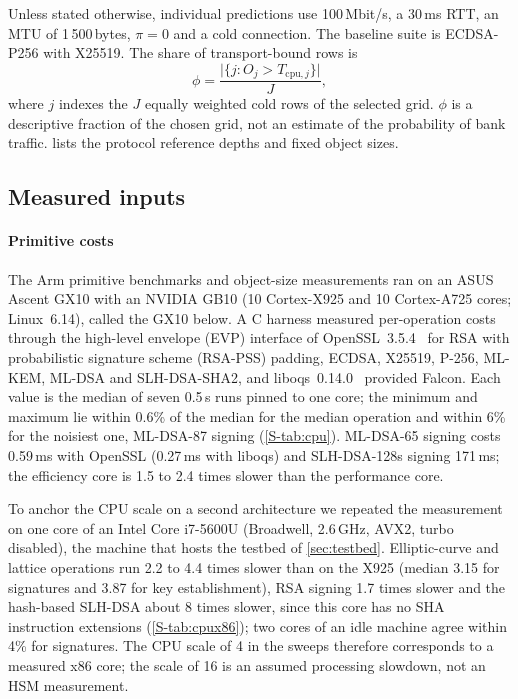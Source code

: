 \documentclass[preprint,12pt]{elsarticle}
\newcommand{\ms}{\,ms\xspace}
\newcommand{\Mbits}{\,Mbit/s\xspace}
\newcommand{\cpu}{\mathrm{cpu}}
\begin{document}
Unless stated otherwise, individual predictions use 100\Mbits, a 30\ms RTT, an MTU of 1\,500\,bytes, $\pi=0$ and a cold connection. The baseline suite is ECDSA-P256 with X25519. The share of transport-bound rows is
\begin{equation}
\phi=\frac{\bigl|\{j:O_j>T_{\cpu,j}\}\bigr|}{J},
\label{eq:share}
\end{equation}
where $j$ indexes the $J$ equally weighted cold rows of the selected grid. $\phi$ is a descriptive fraction of the chosen grid, not an estimate of the probability of bank traffic.  lists the protocol reference depths and fixed object sizes.

\subsection{Measured inputs}
\label{sec:meas}
\paragraph{Primitive costs} The Arm primitive benchmarks and object-size measurements ran on an ASUS Ascent GX10 with an NVIDIA GB10 (10 Cortex-X925 and 10 Cortex-A725 cores; Linux~6.14), called the GX10 below. A C harness measured per-operation costs through the high-level envelope (EVP) interface of OpenSSL~3.5.4~\cite{openssl35} for RSA with probabilistic signature scheme (RSA-PSS) padding, ECDSA, X25519, P-256, ML-KEM, ML-DSA and SLH-DSA-SHA2, and liboqs~0.14.0~\cite{stebila2016} provided Falcon. Each value is the median of seven 0.5\,s runs pinned to one core; the minimum and maximum lie within 0.6\% of the median for the median operation and within 6\% for the noisiest one, ML-DSA-87 signing (\cref{S-tab:cpu}). ML-DSA-65 signing costs 0.59\ms with OpenSSL (0.27\ms with liboqs) and SLH-DSA-128s signing 171\ms; the efficiency core is 1.5 to 2.4 times slower than the performance core.

To anchor the CPU scale on a second architecture we repeated the measurement on one core of an Intel Core i7-5600U (Broadwell, 2.6\,GHz, AVX2, turbo disabled), the machine that hosts the testbed of \cref{sec:testbed}. Elliptic-curve and lattice operations run 2.2 to 4.4 times slower than on the X925 (median 3.15 for signatures and 3.87 for key establishment), RSA signing 1.7 times slower and the hash-based SLH-DSA about 8 times slower, since this core has no SHA instruction extensions (\cref{S-tab:cpux86}); two cores of an idle machine agree within 4\% for signatures. The CPU scale of 4 in the sweeps therefore corresponds to a measured x86 core; the scale of 16 is an assumed processing slowdown, not an HSM measurement.
\end{document}
